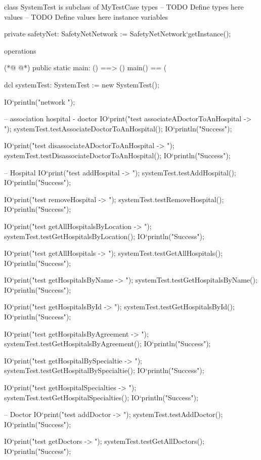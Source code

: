\begin{vdmpp}[breaklines=true]
class SystemTest is subclass of MyTestCase
types
-- TODO Define types here
values
-- TODO Define values here
instance variables
  
  private safetyNet: SafetyNetNetwork := SafetyNetNetwork`getInstance();

operations


(*@
\label{main:13}
@*)
public static main: () ==> ()
main() == (
 
  dcl systemTest: SystemTest := new SystemTest();
 
  IO`println("network ");
 
  -- association hospital - doctor 
  IO`print("test associateADoctorToAnHospital -> ");
  systemTest.testAssociateDoctorToAnHospital();
  IO`println("Success");
  
  IO`print("test disassociateADoctorToAnHospital -> ");
  systemTest.testDisassociateDoctorToAnHospital();
  IO`println("Success");
  
  
  -- Hospital
  IO`print("test addHospital -> ");
  systemTest.testAddHospital();
  IO`println("Success");

  IO`print("test removeHospital -> ");
  systemTest.testRemoveHospital();
  IO`println("Success");
  
  IO`print("test getAllHospitalsByLocation -> ");
  systemTest.testGetHospitalsByLocation();
  IO`println("Success");
  
  IO`print("test getAllHospitals -> ");
  systemTest.testGetAllHospitals();
  IO`println("Success");
  
  IO`print("test getHospitalsByName -> ");
  systemTest.testGetHospitalsByName();
  IO`println("Success");
  
  IO`print("test getHospitalsById -> ");
  systemTest.testGetHospitalsById();
  IO`println("Success");
  
  IO`print("test getHospitalsByAgreement -> ");
  systemTest.testGetHospitalsByAgreement();
  IO`println("Success");
  
  IO`print("test getHospitalBySpecialtie -> ");
  systemTest.testGetHospitalBySpecialtie();
  IO`println("Success");
  
  IO`print("test getHospitalSpecialties -> ");
  systemTest.testGetHospitalSpecialties();
  IO`println("Success");

  -- Doctor
  IO`print("test addDoctor -> ");
  systemTest.testAddDoctor();
  IO`println("Success");
  
  IO`print("test getDoctors -> ");
  systemTest.testGetAllDoctors();
  IO`println("Success");
  

\end{vdmpp}
